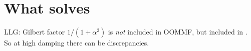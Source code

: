 \section{What \mumax solves}

LLG: Gilbert factor $1/(1+\alpha^2)$ is \emph{not} included in OOMMF, but included in \mumax. So at high damping there can be discrepancies.
